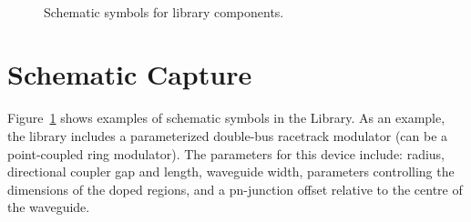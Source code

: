 \documentclass[journal]{spie}
\begin{document}
\begin{figure}[tbp]
\centering   
{} 
 \\
\caption{Schematic symbols for library components.}
\label{Symbols}
\end{figure}






\section{Schematic Capture} 

Figure~\ref{Symbols} shows examples of schematic symbols in the Library.   As an example, the library includes a parameterized double-bus racetrack modulator (can be a point-coupled ring modulator).  The parameters for this device include: radius, directional coupler gap and length, waveguide width, parameters controlling the dimensions of the doped regions, and a pn-junction offset relative to the centre of the waveguide.
\end{document}
